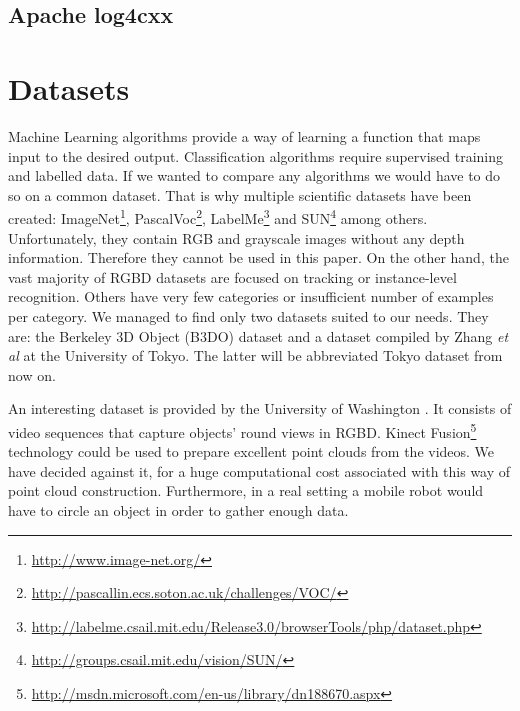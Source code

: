 	\subsection{Apache log4cxx}
	
\section{Datasets}

	Machine Learning algorithms provide a way of learning a function that maps input to the desired output. Classification algorithms require supervised training and labelled data. If we wanted to compare any algorithms we would have to do so on a common dataset. That is why multiple scientific datasets have been created: ImageNet\footnote{\url{http://www.image-net.org/}}, PascalVoc\footnote{\url{http://pascallin.ecs.soton.ac.uk/challenges/VOC/}}, LabelMe\footnote{\url{http://labelme.csail.mit.edu/Release3.0/browserTools/php/dataset.php}} and SUN\footnote{\url{http://groups.csail.mit.edu/vision/SUN/}} among others. Unfortunately, they contain RGB and grayscale images without any depth information. Therefore they cannot be used in this paper. On the other hand, the vast majority of RGBD datasets are focused on tracking or instance-level recognition. Others have very few categories or insufficient number of examples per category. We managed to find only two datasets suited to our needs. They are: the Berkeley 3D Object (B3DO) dataset \cite{B3DO} and a dataset compiled by Zhang \emph{et al} at the University of Tokyo\cite{zhangcategory}. The latter will be abbreviated Tokyo dataset from now on. 
	
	An interesting dataset is provided by the University of Washington \cite{dataset_washington}. It consists of video sequences that capture objects' round views in RGBD. Kinect Fusion\footnote{\url{http://msdn.microsoft.com/en-us/library/dn188670.aspx}} technology could be used to prepare excellent point clouds from the videos. We have decided against it, for a huge computational cost associated with this way of point cloud construction. Furthermore, in a real setting a mobile robot would have to circle an object in order to gather enough data.

